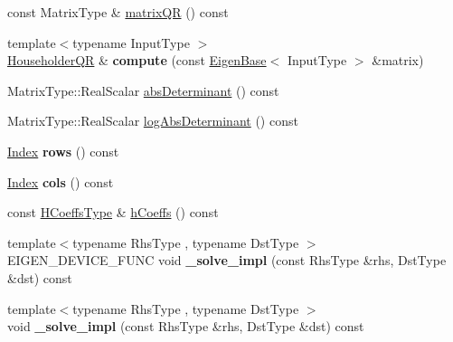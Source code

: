 \begin{DoxyCompactItemize}
const Matrix\+Type \& \hyperlink{group___q_r___module_ae837f2fb30099212c53b3042c7d699c9}{matrix\+QR} () const
\item 
\mbox{\label{group___q_r___module_aa8c555a962ee6fc24387696980d3068b}} 
{\footnotesize template$<$typename Input\+Type $>$ }\\\hyperlink{group___q_r___module_class_eigen_1_1_householder_q_r}{Householder\+QR} \& {\bfseries compute} (const \hyperlink{group___core___module_struct_eigen_1_1_eigen_base}{Eigen\+Base}$<$ Input\+Type $>$ \&matrix)
\item 
Matrix\+Type\+::\+Real\+Scalar \hyperlink{group___q_r___module_a426973a8d79b6295ebca5bf27942937b}{abs\+Determinant} () const
\item 
Matrix\+Type\+::\+Real\+Scalar \hyperlink{group___q_r___module_a4bbcaaa2589939acd169c324b6b1907e}{log\+Abs\+Determinant} () const
\item 
\mbox{\label{group___q_r___module_aa5d8f6ec5fbedfdf0ec0d02459981e69}} 
\hyperlink{namespace_eigen_a62e77e0933482dafde8fe197d9a2cfde}{Index} {\bfseries rows} () const
\item 
\mbox{\label{group___q_r___module_a2cd92da5485f0c4b79f39d7503e5c3f7}} 
\hyperlink{namespace_eigen_a62e77e0933482dafde8fe197d9a2cfde}{Index} {\bfseries cols} () const
\item 
const \hyperlink{class_eigen_1_1internal_1_1_tensor_lazy_evaluator_writable}{H\+Coeffs\+Type} \& \hyperlink{group___q_r___module_ae931aa44cde62317b57a9ae661d184be}{h\+Coeffs} () const
\item 
\mbox{\label{group___q_r___module_a33e033839ef123abf9768a686678abc0}} 
{\footnotesize template$<$typename Rhs\+Type , typename Dst\+Type $>$ }\\E\+I\+G\+E\+N\+\_\+\+D\+E\+V\+I\+C\+E\+\_\+\+F\+U\+NC void {\bfseries \+\_\+solve\+\_\+impl} (const Rhs\+Type \&rhs, Dst\+Type \&dst) const
\item 
\mbox{\label{group___q_r___module_ade4806131aa604a7e767a276d99894e9}} 
{\footnotesize template$<$typename Rhs\+Type , typename Dst\+Type $>$ }\\void {\bfseries \+\_\+solve\+\_\+impl} (const Rhs\+Type \&rhs, Dst\+Type \&dst) const
\end{DoxyCompactItemize}
